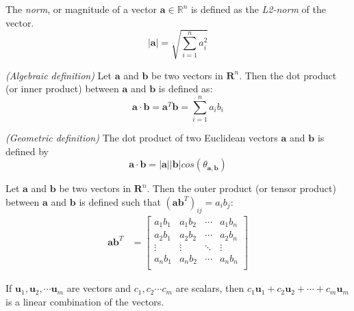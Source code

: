 \begin{definition}[Norm]
 The \emph{norm}, or magnitude of a vector $\bm{a}\in\mathbb{R}^n$ is defined as the \emph{L2-norm} of the vector.
 \begin{equation}
     |\bm{a}|=\sqrt{\sum_{i=1}^{n}a_i^2}
 \end{equation}
\end{definition}

\begin{definition}
\emph{(Algebraic definition)} Let $\bm{a}$ and $\bm{b}$ be two vectors in $\bm{R}^n$. Then the dot product (or inner product) between $\bm{a}$ and $\bm{b}$ is defined as:
    \begin{equation}
        \bm{a}\cdot\bm{b}=\bm{a}^T\bm{b}=\sum_{i=1}^{n}a_ib_i
    \end{equation}
    
\emph{(Geometric definition)}  The dot product of two Euclidean vectors $\bm{a}$ and $\bm{b}$ is defined by
    \begin{equation}
        \bm{a}\cdot\bm{b}=|\bm{a}||\bm{b}|cos(\theta_{\bm{a},\bm{b}})
    \end{equation}
\end{definition}

\begin{definition}
Let $\bm{a}$ and $\bm{b}$ be two vectors in $\bm{R}^n$. Then the outer product (or tensor product) between $\bm{a}$ and $\bm{b}$ is defined such that $(\bm{a}\bm{b}^T)_{ij}=a_ib_j$:
    \begin{align}
        \bm{a}\bm{b}^T&=\begin{bmatrix}
        a_1b_1 & a_1b_2 & \cdots & a_1b_n\\
        a_2b_1 & a_2b_2 & \cdots & a_2b_n\\
        \vdots & \vdots & \ddots & \vdots\\
        a_nb_1 & a_nb_2 & \cdots & a_nb_n\\
        \end{bmatrix}
    \end{align}
\end{definition}


\begin{definition}
If $\bm{u}_1, \bm{u}_2, \cdots \bm{u}_m$ are vectors and $c_1, c_2\cdots c_m$ are scalars, then
    $c_1\bm{u}_1+c_2\bm{u}_2+\cdots+c_m\bm{u}_m$
is a linear combination of the vectors.
\end{definition}

